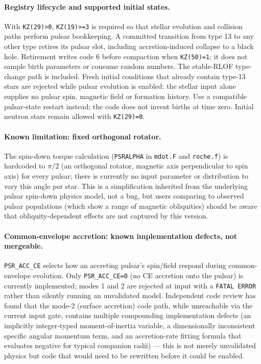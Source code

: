 \paragraph{Registry lifecycle and supported initial states.} With \texttt{KZ(29)>0}, \texttt{KZ(19)>=3} is required so that stellar evolution and collision paths perform pulsar bookkeeping. A committed transition from type 13 to any other type retires its pulsar slot, including accretion-induced collapse to a black hole. Retirement writes code 6 before compaction when \texttt{KZ(50)=1}; it does not sample birth parameters or consume random numbers. The stable-RLOF type-change path is included. Fresh initial conditions that already contain type-13 stars are rejected while pulsar evolution is enabled: the stellar input alone supplies no pulsar spin, magnetic field or formation history. Use a compatible pulsar-state restart instead; the code does not invent births at time zero. Initial neutron stars remain allowed with \texttt{KZ(29)=0}.

\paragraph{Known limitation: fixed orthogonal rotator.} The spin-down torque calculation (\texttt{PSRALPHA} in \texttt{mdot.F} and \texttt{roche.f}) is hardcoded to $\pi/2$ (an orthogonal rotator, magnetic axis perpendicular to spin axis) for every pulsar; there is currently no input parameter or distribution to vary this angle per star. This is a simplification inherited from the underlying pulsar spin-down physics model, not a bug, but users comparing to observed pulsar populations (which show a range of magnetic obliquities) should be aware that obliquity-dependent effects are not captured by this version.

\paragraph{Common-envelope accretion: known implementation defects, not mergeable.} \texttt{PSR\_ACC\_CE} selects how an accreting pulsar's spin/field respond during common-envelope evolution. Only \texttt{PSR\_ACC\_CE=0} (no CE accretion onto the pulsar) is currently implemented; modes 1 and 2 are rejected at input with a \texttt{FATAL ERROR} rather than silently running an unvalidated model. Independent code review has found that the mode-2 (surface accretion) code path, while unreachable via the current input gate, contains multiple compounding implementation defects (an implicitly integer-typed moment-of-inertia variable, a dimensionally inconsistent specific angular momentum term, and an accretion-rate fitting formula that evaluates negative for typical companion radii) — this is not merely unvalidated physics but code that would need to be rewritten before it could be enabled.

